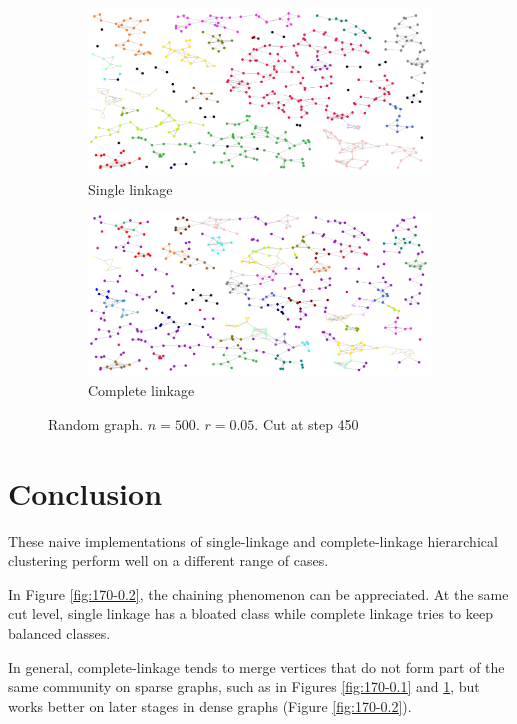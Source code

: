 \documentclass[12pt,a4paper]{article}
\begin{document}
\begin{figure}
  \centering
  \begin{subfigure}[h]{1\textwidth}
    \includegraphics[width=\linewidth]{img/slink-500-450-005.png}
    \caption{Single linkage}
  \end{subfigure}
  \begin{subfigure}[h]{1\textwidth}
    \includegraphics[width=\linewidth]{img/clink-500-450-005.png}
    \caption{Complete linkage}
  \end{subfigure}
  \caption{Random graph. $n = 500$. $r = 0.05$. Cut at step 450}
  \label{fig:450-0.05}
\end{figure}

\section{Conclusion}

These naive implementations of single-linkage and complete-linkage
hierarchical clustering perform well on a different range of cases.

In Figure \ref{fig:170-0.2}, the chaining phenomenon can be
appreciated. At the same cut level, single linkage has a bloated class
while complete linkage tries to keep balanced classes.

In general, complete-linkage tends to merge vertices that do not form
part of the same community on sparse graphs, such as in Figures
\ref{fig:170-0.1} and \ref{fig:450-0.05}, but works better on later
stages in dense graphs (Figure \ref{fig:170-0.2}).
\end{document}
